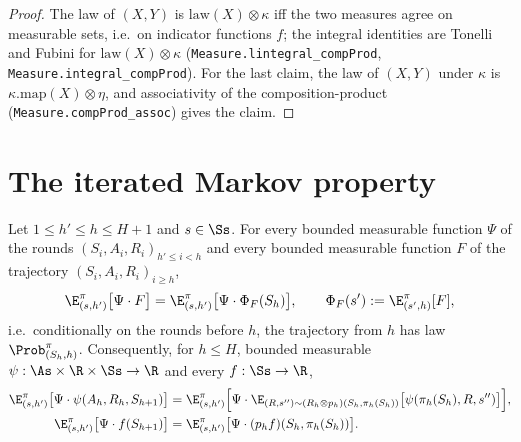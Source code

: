 \begin{proof}
\leanok
The law of $(X, Y)$ is $\mathrm{law}(X) \otimes \kappa$ iff the two measures agree on measurable sets,
i.e.\ on indicator functions $f$; the integral identities are Tonelli and Fubini for
$\mathrm{law}(X) \otimes \kappa$ (\texttt{Measure.lintegral\_compProd},
\texttt{Measure.integral\_compProd}). For the last claim, the law of $(X, Y)$ under $\kappa$ is
$\kappa.\mathrm{map}(X) \otimes \eta$, and associativity of the composition-product
(\texttt{Measure.compProd\_assoc}) gives the claim.
\end{proof}

\section{The iterated Markov property}
\label{sec:pre_mdp_markov}

\begin{lemma}\label{lem:pmdp_markov_iter}
\leanok
{}
Let $1 \le h' \le h \le H + 1$ and $s \in \Ss$. For every bounded measurable function $\Psi$ of
the rounds $(S_i, A_i, R_i)_{h' \le i < h}$ and every bounded measurable function $F$ of the
trajectory $(S_i, A_i, R_i)_{i \ge h}$,
\[
  \E^\pi_{(s,h')}\big[\Psi\cdot F\big] = \E^\pi_{(s,h')}\big[\Psi\cdot \Phi_F(S_h)\big],
  \qquad \Phi_F(s') := \E^\pi_{(s', h)}[F] ,
\]
i.e.\ conditionally on the rounds before $h$, the trajectory from $h$ has law
$\Prob^\pi_{(S_h, h)}$. Consequently, for $h \le H$, bounded measurable
$\psi : \As \times \R \times \Ss \to \R$ and every $f : \Ss \to \R$,
\begin{align*}
  \E^\pi_{(s,h')}\big[\Psi\cdot\psi(A_h, R_h, S_{h+1})\big]
  &= \E^\pi_{(s,h')}\Big[\Psi\cdot\E_{(R, s'') \sim (R_h \otimes p_h)(S_h, \pi_h(S_h))}\big[\psi(\pi_h(S_h), R, s'')\big]\Big], \\
  \E^\pi_{(s,h')}\big[\Psi\cdot f(S_{h+1})\big]
  &= \E^\pi_{(s,h')}\big[\Psi\cdot (p_h f)(S_h, \pi_h(S_h))\big] .
\end{align*}
\end{lemma}


